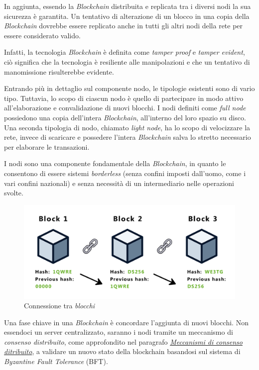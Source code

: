 In aggiunta, essendo la \textit{Blockchain} distribuita e replicata tra i diversi nodi la sua sicurezza è garantita. Un tentativo di alterazione di un blocco in una copia della \textit{Blockchain} dovrebbe essere replicato anche in tutti gli altri nodi della rete per essere considerato valido. \cite{bitsmap-block}

Infatti, la tecnologia \textit{Blockchain} è definita come \textit{tamper proof} e \textit{tamper evident}, ciò significa che la tecnologia è resiliente alle manipolazioni e che un tentativo di manomissione risulterebbe evidente. \cite{coinmarket-tamperProof}

Entrando più in dettaglio sul componente nodo, le tipologie esistenti sono di vario tipo. Tuttavia, lo scopo di ciascun nodo è quello di partecipare in modo attivo all'elaborazione e convalidazione di nuovi blocchi. I nodi definiti come \textit{full node}  possiedono una copia dell'intera \textit{Blockchain}, all'interno del loro spazio su disco.
Una seconda tipologia di nodo, chiamato \textit{light node}, ha lo scopo di velocizzare la rete, invece di scaricare e possedere l'intera \textit{Blockchain} salva lo stretto necessario per elaborare le transazioni. \cite{originstamp-nodi}

I nodi sono una componente fondamentale della \textit{Blockchain}, in quanto le consentono di essere sistemi \textit{borderless} (senza confini imposti dall'uomo, come i vari confini nazionali) e senza necessità di un intermediario nelle operazioni svolte. \cite{binance-blockchain}

\begin{figure}[ht]
\centering
\includegraphics[scale=0.35]{images/blockchain-hash}
\caption{Connessione tra \emph{blocchi}}
\label{fig:blockchain-hash}
\end{figure}

Una fase chiave in una \textit{Blockchain} è concordare l'aggiunta di nuovi blocchi. Non essendoci un server centralizzato, saranno i nodi tramite un meccanismo di \textit{consenso distribuito}, come approfondito nel paragrafo \hyperref[sec:consensoDistribuito]{\textit{Meccanismi di consenso ditribuito}}, 
a validare un nuovo stato della blockchain basandosi sul sistema di \textit{Byzantine Fault Tolerance} (BFT).\cite{binance-bft}

